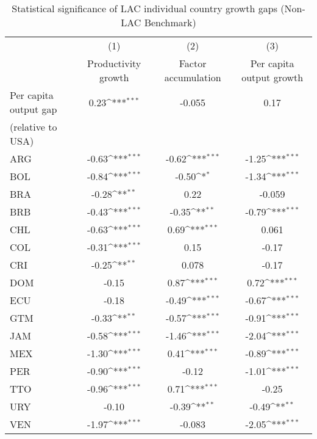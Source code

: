 \begin{table}[htbp]\centering
\def\sym#1{\ifmmode^{#1}\else\(^{#1}\)\fi}
\caption{Statistical significance of LAC individual country growth gaps (Non-LAC Benchmark)}
\begin{tabular}{l*{3}{c}}
\toprule
                &\multicolumn{1}{c}{(1)}&\multicolumn{1}{c}{(2)}&\multicolumn{1}{c}{(3)}\\
                &\multicolumn{1}{c}{Productivity growth}&\multicolumn{1}{c}{Factor accumulation}&\multicolumn{1}{c}{Per capita output growth}\\
\midrule
Per capita output gap &     0.23\sym{***}&   -0.055         &     0.17         \\
(relative to USA) & & & \\
ARG             &    -0.63\sym{***}&    -0.62\sym{***}&    -1.25\sym{***}\\
BOL             &    -0.84\sym{***}&    -0.50\sym{*}  &    -1.34\sym{***}\\
BRA             &    -0.28\sym{**} &     0.22         &   -0.059         \\
BRB             &    -0.43\sym{***}&    -0.35\sym{**} &    -0.79\sym{***}\\
CHL             &    -0.63\sym{***}&     0.69\sym{***}&    0.061         \\
COL             &    -0.31\sym{***}&     0.15         &    -0.17         \\
CRI             &    -0.25\sym{**} &    0.078         &    -0.17         \\
DOM             &    -0.15         &     0.87\sym{***}&     0.72\sym{***}\\
ECU             &    -0.18         &    -0.49\sym{***}&    -0.67\sym{***}\\
GTM             &    -0.33\sym{**} &    -0.57\sym{***}&    -0.91\sym{***}\\
JAM             &    -0.58\sym{***}&    -1.46\sym{***}&    -2.04\sym{***}\\
MEX             &    -1.30\sym{***}&     0.41\sym{***}&    -0.89\sym{***}\\
PER             &    -0.90\sym{***}&    -0.12         &    -1.01\sym{***}\\
TTO             &    -0.96\sym{***}&     0.71\sym{***}&    -0.25         \\
URY             &    -0.10         &    -0.39\sym{**} &    -0.49\sym{**} \\
VEN             &    -1.97\sym{***}&   -0.083         &    -2.05\sym{***}\\

\end{tabular}
\end{table}
